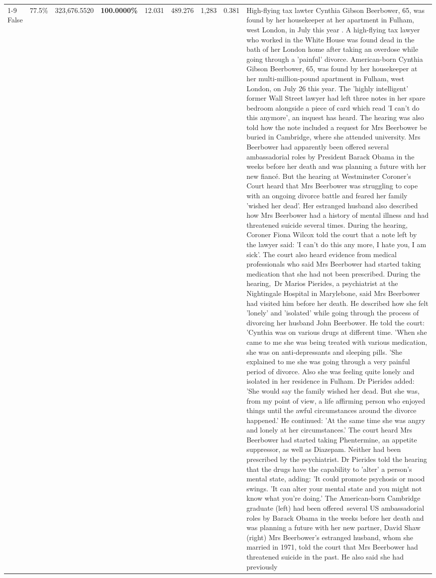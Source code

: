 \begin{table}[H]
\begin{tabular}{lllrlllll}
\cline{1-9}
False & 77.5\% & 323,676.5520 & \bfseries \color{red} 100.0000\% & 12.031 & 489.276 & 1,283 & 0.381 & High-flying tax lawter Cynthia Gibson Beerbower, 65, was found by her housekeeper at her apartment in Fulham, west London, in July this year . A high-flying tax lawyer who worked in the White House was found dead in the bath of her London home after taking an overdose while going through a 'painful' divorce. American-born Cynthia Gibson Beerbower, 65, was found by her housekeeper at her multi-million-pound apartment in Fulham, west London, on July 26 this year. The 'highly intelligent' former Wall Street lawyer had left three notes in her spare bedroom alongside a piece of card which read 'I can't do this anymore', an inquest has heard. The hearing was also told how the note included a request for Mrs Beerbower be buried in Cambridge, where she attended university. Mrs Beerbower had apparently been offered several ambassadorial roles by President Barack Obama in the weeks before her death and was planning a future with her new fiancé. But the hearing at Westminster Coroner's Court heard that Mrs Beerbower was struggling to cope with an ongoing divorce battle and feared her family 'wished her dead'. Her estranged husband also described how Mrs Beerbower had a history of mental illness and had threatened suicide several times. During the hearing, Coroner Fiona Wilcox told the court that a note left by the lawyer said: 'I can't do this any more, I hate you, I am sick'. The court also heard evidence from medical professionals who said Mrs Beerbower had started taking medication that she had not been prescribed. During the hearing, Dr Marios Pierides, a psychiatrist at the Nightingale Hospital in Marylebone, said Mrs Beerbower had visited him before her death. He described how she felt 'lonely' and 'isolated' while going through the process of divorcing her husband John Beerbower. He told the court: 'Cynthia was on various drugs at different time. 'When she came to me she was being treated with various medication, she was on anti-depressants and sleeping pills. 'She explained to me she was going through a very painful period of divorce. Also she was feeling quite lonely and isolated in her residence in Fulham. Dr Pierides added: 'She would say the family wished her dead. But she was, from my point of view, a life affirming person who enjoyed things until the awful circumstances around the divorce happened.' He continued: 'At the same time she was angry and lonely at her circumstances.' The court heard Mrs Beerbower had started taking Phentermine, an appetite suppressor, as well as Diazepam. Neither had been prescribed by the psychiatrist. Dr Pierides told the hearing that the drugs have the capability to 'alter' a person's mental state, adding: 'It could promote psychosis or mood swings. 'It can alter your mental state and you might not know what you're doing.' The American-born Cambridge graduate (left) had been offered several US ambassadorial roles by Barack Obama in the weeks before her death and was planning a future with her new partner, David Shaw (right) Mrs Beerbower's estranged husband, whom she married in 1971, told the court that Mrs Beerbower had threatened suicide in the past. He also said she had previously 
\end{tabular}
\end{table}
